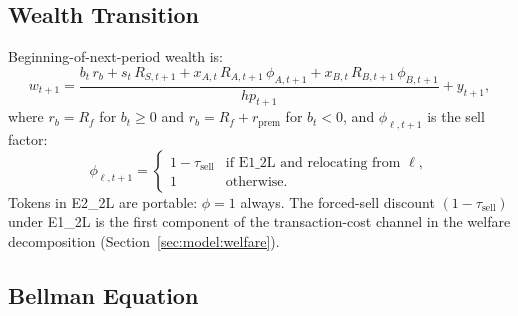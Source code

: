 \subsection{Wealth Transition}
\label{sec:model:wealth}

Beginning-of-next-period wealth is:
\begin{equation}
    w_{t+1} = \frac{b_t\,r_b + s_t\,R_{S,t+1}
                    + x_{A,t}\,R_{A,t+1}\,\phi_{A,t+1}
                    + x_{B,t}\,R_{B,t+1}\,\phi_{B,t+1}}
                   {\mathit{hp}_{t+1}}
              + y_{t+1},
    \label{eq:wealth_transition}
\end{equation}
where $r_b = R_f$ for $b_t \geq 0$ and $r_b = R_f + r_{\text{prem}}$
for $b_t < 0$, and $\phi_{\ell,t+1}$ is the sell factor:
\begin{equation}
    \phi_{\ell,t+1} = \begin{cases}
        1 - \tau_{\text{sell}} & \text{if E1\_2L and relocating from } \ell, \\
        1 & \text{otherwise.}
    \end{cases}
    \label{eq:sell_factor}
\end{equation}
Tokens in E2\_2L are portable: $\phi = 1$ always.  The forced-sell discount
$(1 - \tau_{\text{sell}})$ under E1\_2L is the first component of the
transaction-cost channel in the welfare decomposition
(Section~\ref{sec:model:welfare}).

\subsection{Bellman Equation}
\label{sec:model:bellman}

